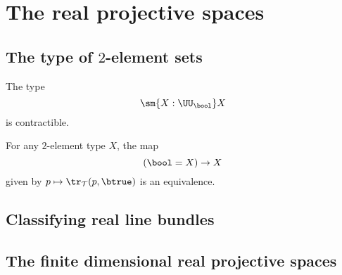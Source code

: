 \section{The real projective spaces}

\subsection{The type of \texorpdfstring{$2$}{2}-element sets}

\begin{thm}
  The type
  \begin{equation*}
    \sm{X:\UU_\bool}X
  \end{equation*}
  is contractible.
\end{thm}

\begin{cor}
  For any $2$-element type $X$, the map
  \begin{equation*}
    (\bool=X)\to X
  \end{equation*}
  given by $p\mapsto\tr_{\mathcal{T}}(p,\btrue)$ is an equivalence.
\end{cor}

\subsection{Classifying real line bundles}

\subsection{The finite dimensional real projective spaces}
